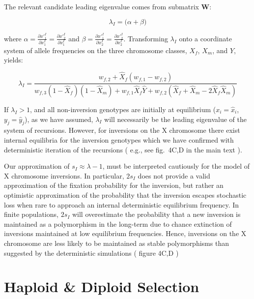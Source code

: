 \documentclass{article}
\newcommand\hl[1]{%
  \bgroup
  \hskip0pt\color{blue!80!black}%
  #1%
  \egroup
}
\begin{document}
\noindent The relevant candidate leading eigenvalue comes from submatrix $\mathbf{W}$:

\begin{equation}
	\lambda_{I} = \big( \alpha + \beta \big)
\end{equation}

where $\alpha = \frac{\partial x'^I_1}{\partial x^I_1} = \frac{\partial x'^I_{2}}{\partial x^I_1}$ and $\beta = \frac{\partial x'^I_1}{\partial x^I_2} = \frac{\partial x'^I_{2}}{\partial x^I_2}$. Transforming $\lambda_I$ onto a coordinate system of allele frequencies on the three chromosome classes, $X_f$, $X_m$, and $Y$, yields:


\begin{equation}
	\lambda_I = \frac{w_{f,2} + \hat{X}_f(w_{f,1} - w_{f,2})} {w_{f,3}(1 - \hat{X}_f)(1 - \hat{X}_m) + w_{f,1} \hat{X}_f \hat{Y} + w_{f,2} (\hat{X}_f + \hat{X}_m - 2 \hat{X}_f \hat{X}_m)}
\end{equation}

\noindent If $\lambda_I > 1$, and all non-inversion genotypes are initially at equilibrium ($x_i = \hat{x}_i$, $y_j = \hat{y}_j$), as we have assumed, $\lambda_I$ will necessarily be the leading eigenvalue of the system of recursions. However, for inversions on the X chromosome there exist internal equilibria for the inversion genotypes which we have confirmed with deterministic iteration of the recursions (\hl{e.g., see fig.~4C,D in the main text}). 

Our approximation of $s_I \approx \lambda - 1$, must be interpreted cautiously for the model of X chromosome inversions. In particular, $2 s_I$ does not provide a valid approximation of the fixation probability for the inversion, but rather an optimistic approximation of the probability that the inversion escapes stochastic loss when rare to approach an internal deterministic equilibrium frequency. In finite populations, $2 s_I$ will overestimate the probability that a new inversion is maintained as a polymorphism in the long-term due to chance extinction of inversions maintained at low equilibrium frequencies. Hence, inversions on the X chromosome are less likely to be maintained as stable polymorphisms than suggested by the deterministic simulations (\hl{ figure 4C,D})

\newpage



 \section{Haploid \& Diploid Selection} \label{AppC}
 \renewcommand{\theequation}{C\arabic{equation}}
 \setcounter{equation}{0}
 \renewcommand{\thefigure}{C\arabic{figure}}
 \setcounter{figure}{0}
\end{document}
